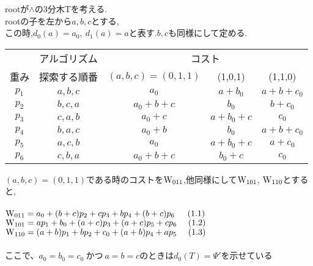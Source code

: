 \documentclass[12pt]{jsarticle}
\begin{document}
\noindent
rootが$\land$の3分木Tを考える.\\
rootの子を左から$a,b,c$とする,\\
この時,$d_0(a)=a_0 , \ d_1(a)=a$と表す.$b,c$も同様にして定める.\\
\begin{center}
\begin{tabular}{|c|c|c|c|c|}
\hline
     & \multicolumn{1}{c|}{アルゴリズム} & \multicolumn{3}{c|}{コスト} \\ \cline{1-5}
重み  & 探索する順番 & $(a,b,c)=(0,1,1)$ & (1,0,1) & (1,1,0) \\ \hline
$p_1$ & $a, b, c$ & $a_0$  & $a+b_0$  & $a+b+c_0$  \\ \hline
$p_2$ & $b, c, a$ & $a_0+b+c$  & $b_0$  & $b+c_0$  \\ \hline
$p_3$ & $c, a, b$ & $a_0+c $ & $a+b_0+c$  & $c_0 $ \\ \hline
$p_4$ & $b, a, c$ & $a_0+b$ & $b_0$  & $a+b+c_0$  \\ \hline
$p_5$ & $a, c, b$ & $a_0 $ & $a+b_0+c$ & $a+c_0$ \\ \hline
$p_6$ & $c, b, a$ & $a_0+b+c$  & $b_0+c$ & $c_0$  \\ \hline
\end{tabular}
\end{center}
$(a,b,c)=(0,1,1)$である時のコストを${\rm W_{011}}$,他同様にして${\rm W_{101}}$, ${\rm W_{110}}$とすると,\\\\
${\rm W_{011}}=a_0+(b+c)p_2+cp_3+bp_4+(b+c)p_6 \ \ \ \ \, (1.1)$\\
${\rm W_{101}}=ap_1+b_0+(a+c)p_3+(a+c)p_5+cp_6 \ \ \ \ (1.2)$\\
${\rm W_{110}}=(a+b)p_1+bp_2+c_0+(a+b)p_4+ap_5 \ \ \ \ (1.3)$\\\\

ここで、$a_0=b_0=c_0~かつ~a=b=cのときはd_0(T)=\Psi 'を示せている$\\\\
\end{document}
